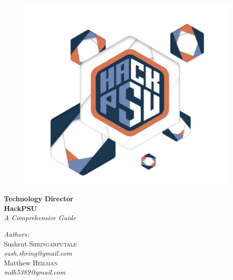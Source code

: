 \documentclass[twoside, 12pt]{article}
\title{\mytitle}
\author{\myauthors}
\date{\mydate}
\begin{document}
\begin{titlepage}
\begin{figure}[h]
    \centering
    \includegraphics[scale=0.6]{logo.png}
    \label{fig:logo}
\end{figure}
{ \fontsize{48pt}{5.5cm} \flushleft \bfseries \textbf{\color{hackpsudarkblue}Technology \color{hackpsuorange} Director}}\\ [0.5cm]
{ \fontsize{48pt}{5.5cm} \color{hackpsured} \textbf{Hack\color{hackpsumdblue}PSU} }\\ [0.5cm]
{ \Huge \textit{\color{hackpsulightblue}A Comprehensive Guide}}\\ [0.5cm]
\begin{minipage}{0.4\textwidth}
\large
\emph{\color{hackpsudarkblue}Authors:}\\
Sushrut \textsc{Shringarputale}\\ \textit{sush.shring@gmail.com}\\
Matthew \textsc{Heilman}\\ \textit{mdh5389@gmail.com}\\
\end{minipage}
\end{titlepage}

\tableofcontents
\newpage

\mbox{}
\vfill
\end{document}
